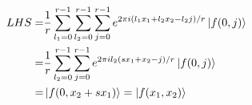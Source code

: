 \ex $$\begin{aligned}
    LHS
    = & \frac{1}{r} \sum_{l_1=0}^{r-1} \sum_{l_2=0}^{r-1} \sum_{j=0}^{r-1} e^{2\pi i(l_1x_1+l_2x_2-l_2j)/r} \left|f(0,j)\right\rangle
    \\ = & \frac{1}{r} \sum_{l_2=0}^{r-1} \sum_{j=0}^{r-1} e^{2\pi il_2(sx_1+x_2-j)/r} \left|f(0,j)\right\rangle
    \\ = & \left|f(0,x_2+sx_1)\right\rangle = \left|f(x_1,x_2)\right\rangle
\end{aligned}$$

\ex \todo

\ex \todo


\ex \todo

\ex \todo

\ex \todo
